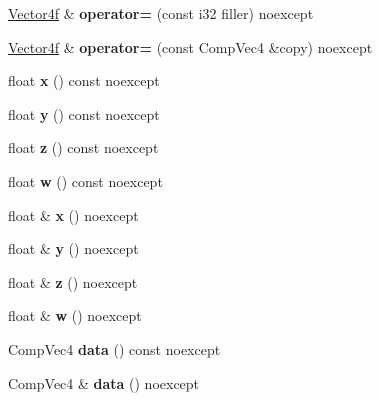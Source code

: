 \begin{DoxyCompactItemize}
\mbox{\hyperlink{class_vector4f}{Vector4f}} \& {\bfseries operator=} (const i32 filler) noexcept
\item 
\mbox{\label{class_vector4f_a5a647d9a94dcc49839cd590a41ad4ee2}} 
\mbox{\hyperlink{class_vector4f}{Vector4f}} \& {\bfseries operator=} (const Comp\+Vec4 \&copy) noexcept
\item 
\mbox{\label{class_vector4f_a16b33f9ebe42f4942a3a7a7f918331a7}} 
float {\bfseries x} () const noexcept
\item 
\mbox{\label{class_vector4f_a46fac29e743256eaa35652bebd4f2db8}} 
float {\bfseries y} () const noexcept
\item 
\mbox{\label{class_vector4f_a3f2c490c48d1754e0e5f0c207c048fb3}} 
float {\bfseries z} () const noexcept
\item 
\mbox{\label{class_vector4f_a5cc0a15ed9a914b4cab754df9da0ca85}} 
float {\bfseries w} () const noexcept
\item 
\mbox{\label{class_vector4f_a00594736874c898bd29f1440d7df1c34}} 
float \& {\bfseries x} () noexcept
\item 
\mbox{\label{class_vector4f_a220e4cb923e68a1f2c6fdd2f0b80fb89}} 
float \& {\bfseries y} () noexcept
\item 
\mbox{\label{class_vector4f_ac6101a1d6c200a9eaffb33735bc00824}} 
float \& {\bfseries z} () noexcept
\item 
\mbox{\label{class_vector4f_aeadf80512284d21d6e9a088d044961dc}} 
float \& {\bfseries w} () noexcept
\item 
\mbox{\label{class_vector4f_adcffc8b32392a08c171974d7ca3a2e29}} 
Comp\+Vec4 {\bfseries data} () const noexcept
\item 
\mbox{\label{class_vector4f_a52ff6f19c1d23cd449f01750c34225d1}} 
Comp\+Vec4 \& {\bfseries data} () noexcept
\item 
\mbox{\label{class_vector4f_acc764bad258499d00eea8a57aefb8bd8}} 

\end{DoxyCompactItemize}
